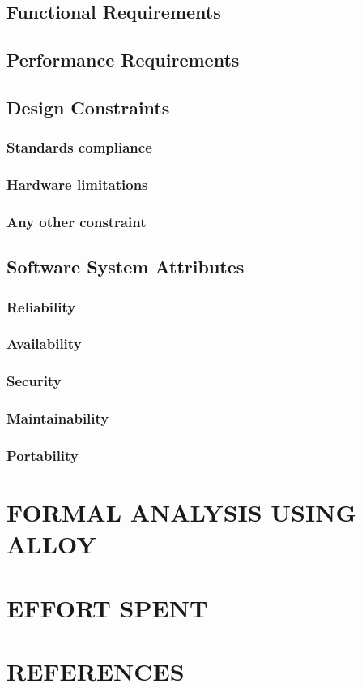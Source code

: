 \documentclass[11pt]{report}
\begin{document}
		\section{Functional Requirements}
			
		\section{Performance Requirements}
		\section{Design Constraints}
			\subsection{Standards compliance}
			\subsection{Hardware limitations}
			\subsection{Any other constraint}
		\section{Software System Attributes}
			\subsection{Reliability}
			\subsection{Availability}
			\subsection{Security}
			\subsection{Maintainability}
			\subsection{Portability}
	\chapter{FORMAL ANALYSIS USING ALLOY}
	\chapter{EFFORT SPENT}
	\chapter{REFERENCES}
\end{document}
